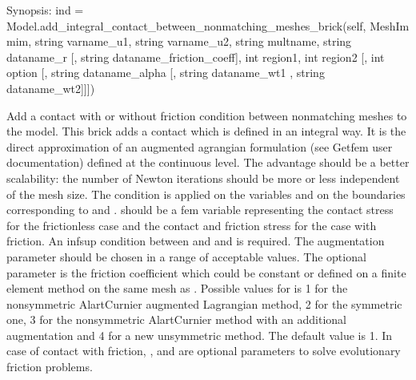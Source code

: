 \documentclass[a4paper,11pt,english]{sphinxmanual}
\begin{document}
\begin{fulllineitems}

\begin{fulllineitems}
\label{\detokenize{python/cmdref_Model:getfem.Model.add_integral_contact_between_nonmatching_meshes_brick}}
Synopsis: ind = Model.add\_integral\_contact\_between\_nonmatching\_meshes\_brick(self,  MeshIm mim, string varname\_u1, string varname\_u2, string multname, string dataname\_r {[}, string dataname\_friction\_coeff{]}, int region1, int region2 {[}, int option {[}, string dataname\_alpha {[}, string dataname\_wt1 , string dataname\_wt2{]}{]}{]})

Add a contact with or without friction condition between nonmatching
meshes to the model. This brick adds a contact which is defined
in an integral way. It is the direct approximation of an augmented
agrangian formulation (see Getfem user documentation) defined at the
continuous level. The advantage should be a better scalability:
the number of Newton iterations should be more or less independent
of the mesh size.
The condition is applied on the variables  and 
on the boundaries corresponding to  and .
 should be a fem variable representing the contact stress
for the frictionless case and the contact and friction stress for the
case with friction. An inf\sphinxhyphen{}sup condition between  and
 and  is required.
The augmentation parameter  should be chosen in a
range of acceptable values.
The optional parameter  is the friction
coefficient which could be constant or defined on a finite element
method on the same mesh as .
Possible values for  is 1 for the non\sphinxhyphen{}symmetric Alart\sphinxhyphen{}Curnier
augmented Lagrangian method, 2 for the symmetric one, 3 for the
non\sphinxhyphen{}symmetric Alart\sphinxhyphen{}Curnier method with an additional augmentation
and 4 for a new unsymmetric method. The default value is 1.
In case of contact with friction, ,  and
 are optional parameters to solve evolutionary friction
problems.


\end{fulllineitems}
\end{fulllineitems}
\end{document}
